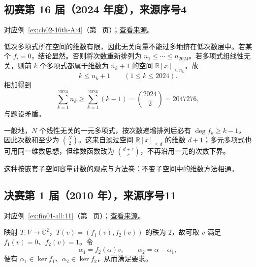 \documentclass[12pt,fontset=fandol]{ctexart}
\begin{document}
\subsection{初赛第 16 届（2024 年度），来源序号4}\label{ans:ch02-16th-A:4}\label{pr:ch02-16th-A:4}

对应例~\ref{ex:ch02-16th-A:4}（第~\pageref{ex:ch02-16th-A:4} 页）；\href{https://github.com/lzxcr/cmc-mathematics/blob/64916fa1fdbc3e444a652eca204d5669058ee321/src/problems/preliminary/16/04.md}{查看来源}。

\begin{solve}

低次多项式所在空间的维数有限，因此无关向量不能过多地挤在低次数层中。若某个 $f_i=0$，结论显然。否则将次数重新排列为 $n_1\leq\cdots\leq n_{2024}$。若多项式组线性无关，则前 $k$ 个多项式都属于维数为 $n_k+1$ 的空间 $\mathbb R[x]_{\leq n_k}$，故
\[
k\leq n_k+1\qquad(1\leq k\leq2024).
\]
相加得到
\[
\sum_{k=1}^{2024}n_k\geq\sum_{k=1}^{2024}(k-1)
=\binom{2024}{2}=2047276,
\]
与题设矛盾。

\end{solve}

\begin{remark}[方法与条件]

一般地，$N$ 个线性无关的一元多项式，按次数递增排列后必有 $\deg f_k\geq k-1$，因此次数和至少为 $\binom N2$。这来自滤过空间 $\mathbb R[x]_{\leq d}$ 的维数 $d+1$；多元多项式也可用同一维数思想，但维数函数改为 $\binom{d+r}{r}$，不再沿用一元的次数下界。

这种按嵌套子空间容量计数的观点与\hyperref[app:linear-invariant]{方法卷：不变子空间}中的维数方法相通。

\end{remark}

\subsection{决赛第 1 届（2010 年），来源序号11}\label{ans:fin01-all:11}\label{pr:fin01-all:11}

对应例~\ref{ex:fin01-all:11}（第~\pageref{ex:fin01-all:11} 页）；\href{https://github.com/lzxcr/cmc-mathematics/blob/64916fa1fdbc3e444a652eca204d5669058ee321/src/problems/finals/01/11.md}{查看来源}。

\begin{solve}

映射 $T:V\to\mathbb C^2$，$T(v)=(f_1(v),f_2(v))$ 的秩为 $2$，故可取 $v$ 满足 $f_1(v)=0$、$f_2(v)=1$。令
\[
\alpha_1=f_2(\alpha)v,\qquad \alpha_2=\alpha-\alpha_1,
\]
便有 $\alpha_1\in\ker f_1$、$\alpha_2\in\ker f_2$，从而满足要求。

\end{solve}
\end{document}
